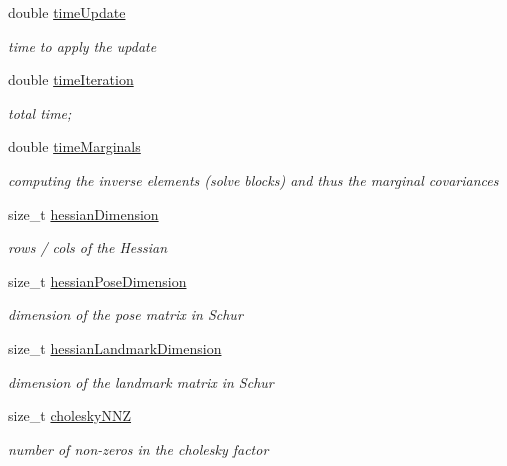 \begin{DoxyCompactItemize}
double \mbox{\hyperlink{structg2o_1_1_g2_o_batch_statistics_a510e287e5a3e1f608219147b53e6dc69}{time\+Update}}
\begin{DoxyCompactList}\small\item\em time to apply the update \end{DoxyCompactList}\item 
double \mbox{\hyperlink{structg2o_1_1_g2_o_batch_statistics_a60fbec94ce0b7f26ed99d3f6d2080e47}{time\+Iteration}}
\begin{DoxyCompactList}\small\item\em total time; \end{DoxyCompactList}\item 
double \mbox{\hyperlink{structg2o_1_1_g2_o_batch_statistics_a58e5d0960dc35e682424dce2b50e4fa9}{time\+Marginals}}
\begin{DoxyCompactList}\small\item\em computing the inverse elements (solve blocks) and thus the marginal covariances \end{DoxyCompactList}\item 
size\+\_\+t \mbox{\hyperlink{structg2o_1_1_g2_o_batch_statistics_a618a15ba153da1a99b19a2d779cf3764}{hessian\+Dimension}}
\begin{DoxyCompactList}\small\item\em rows / cols of the Hessian \end{DoxyCompactList}\item 
size\+\_\+t \mbox{\hyperlink{structg2o_1_1_g2_o_batch_statistics_ae2af64720e3f99557924b9cf92ab6f20}{hessian\+Pose\+Dimension}}
\begin{DoxyCompactList}\small\item\em dimension of the pose matrix in Schur \end{DoxyCompactList}\item 
size\+\_\+t \mbox{\hyperlink{structg2o_1_1_g2_o_batch_statistics_a0cfa7018402074f47defb9cd5d9d4b64}{hessian\+Landmark\+Dimension}}
\begin{DoxyCompactList}\small\item\em dimension of the landmark matrix in Schur \end{DoxyCompactList}\item 
size\+\_\+t \mbox{\hyperlink{structg2o_1_1_g2_o_batch_statistics_a5996c5ba000bdfcbcf5c0375a3c62643}{cholesky\+N\+NZ}}
\begin{DoxyCompactList}\small\item\em number of non-\/zeros in the cholesky factor \end{DoxyCompactList}\end{DoxyCompactItemize}
